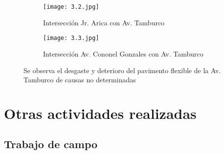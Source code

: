 \newpage
\begin{figure}[H]
	\begin{subfigure}{0.45\textwidth}
		\texttt{[image: 3.2.jpg]}
		\caption{Intersección Jr. Arica con Av. Tamburco}
		\label{fig:subfigura3}
	\end{subfigure}
	\hfill
	\begin{subfigure}{0.45\textwidth}
		\texttt{[image: 3.3.jpg]}
		\caption{Intersección Av. Cononel Gonzales con Av. Tamburco}
		\label{fig:subfigura4}
	\end{subfigure}

	\caption{Se observa el desgaste y deterioro del pavimento flexible de la Av. Tamburco de causas no determinadas}
	\label{fig:at-cg}
\end{figure}

\section{Otras actividades realizadas}
\subsection{Trabajo de campo}


